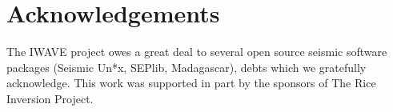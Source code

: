 \section{Acknowledgements}
The IWAVE
project owes a great deal to several open source seismic software
packages (Seismic Un*x, SEPlib, Madagascar), debts which we gratefully
acknowledge. This work was supported in part by the sponsors of The Rice Inversion Project.




